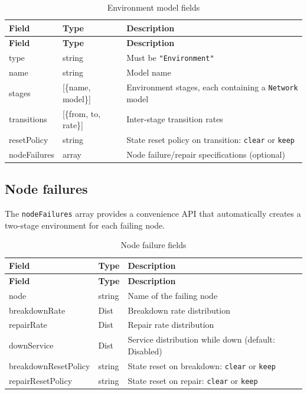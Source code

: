 \begin{footnotesize}
\begin{longtable}{|T{2.8cm}|T{3.2cm}|D{6.9cm}|}
\caption{Environment model fields}\label{tab:json-env}
\\\hline
\textbf{Field} & \textbf{Type} & \textbf{Description} \\\hline
\endfirsthead
\hline \textbf{Field} & \textbf{Type} & \textbf{Description} \\\hline
\endhead
\hline
\endfoot
type         & string & Must be \texttt{"Environment"} \\\hline
name         & string & Model name \\\hline
stages       & [\{name, model\}] & Environment stages, each containing a \texttt{Network} model \\\hline
transitions  & [\{from, to, rate\}] & Inter-stage transition rates \\\hline
resetPolicy  & string & State reset policy on transition: \texttt{clear} or \texttt{keep} \\\hline
nodeFailures & array  & Node failure/repair specifications (optional) \\\hline
\end{longtable}
\end{footnotesize}

\subsection{Node failures}
\label{json:env-failures}

The \texttt{nodeFailures} array provides a convenience API that automatically creates a two-stage environment for each failing node.

\begin{footnotesize}
\begin{longtable}{|T{3.5cm}|T{2.2cm}|D{7.2cm}|}
\caption{Node failure fields}\label{tab:json-nodefail}
\\\hline
\textbf{Field} & \textbf{Type} & \textbf{Description} \\\hline
\endfirsthead
\hline \textbf{Field} & \textbf{Type} & \textbf{Description} \\\hline
\endhead
\hline
\endfoot
node                 & string & Name of the failing node \\\hline
breakdownRate        & Dist   & Breakdown rate distribution \\\hline
repairRate           & Dist   & Repair rate distribution \\\hline
downService          & Dist   & Service distribution while down (default: Disabled) \\\hline
breakdownResetPolicy & string & State reset on breakdown: \texttt{clear} or \texttt{keep} \\\hline
repairResetPolicy    & string & State reset on repair: \texttt{clear} or \texttt{keep} \\\hline
\end{longtable}
\end{footnotesize}

